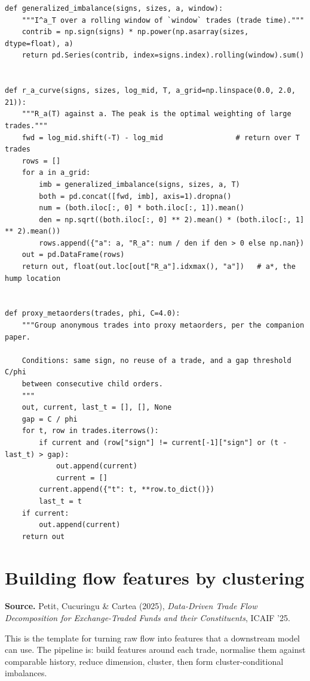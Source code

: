 \documentclass[11pt]{article}
\begin{document}
\begin{lstlisting}[caption={Generalised imbalance and the hump in $a$. This runs on a
trade tape alone: signs, sizes, prices.}]
def generalized_imbalance(signs, sizes, a, window):
    """I^a_T over a rolling window of `window` trades (trade time)."""
    contrib = np.sign(signs) * np.power(np.asarray(sizes, dtype=float), a)
    return pd.Series(contrib, index=signs.index).rolling(window).sum()


def r_a_curve(signs, sizes, log_mid, T, a_grid=np.linspace(0.0, 2.0, 21)):
    """R_a(T) against a. The peak is the optimal weighting of large trades."""
    fwd = log_mid.shift(-T) - log_mid                 # return over T trades
    rows = []
    for a in a_grid:
        imb = generalized_imbalance(signs, sizes, a, T)
        both = pd.concat([fwd, imb], axis=1).dropna()
        num = (both.iloc[:, 0] * both.iloc[:, 1]).mean()
        den = np.sqrt((both.iloc[:, 0] ** 2).mean() * (both.iloc[:, 1] ** 2).mean())
        rows.append({"a": a, "R_a": num / den if den > 0 else np.nan})
    out = pd.DataFrame(rows)
    return out, float(out.loc[out["R_a"].idxmax(), "a"])   # a*, the hump location


def proxy_metaorders(trades, phi, C=4.0):
    """Group anonymous trades into proxy metaorders, per the companion paper.

    Conditions: same sign, no reuse of a trade, and a gap threshold C/phi
    between consecutive child orders.
    """
    out, current, last_t = [], [], None
    gap = C / phi
    for t, row in trades.iterrows():
        if current and (row["sign"] != current[-1]["sign"] or (t - last_t) > gap):
            out.append(current)
            current = []
        current.append({"t": t, **row.to_dict()})
        last_t = t
    if current:
        out.append(current)
    return out
\end{lstlisting}

\section{Building flow features by clustering}\label{sec:petit}

\textbf{Source.} Petit, Cucuringu \& Cartea (2025), \emph{Data-Driven Trade Flow
Decomposition for Exchange-Traded Funds and their Constituents}, ICAIF '25.

This is the template for turning raw flow into features that a downstream model
can use. The pipeline is: build features around each trade, normalise them
against comparable history, reduce dimension, cluster, then form
cluster-conditional imbalances.
\end{document}
